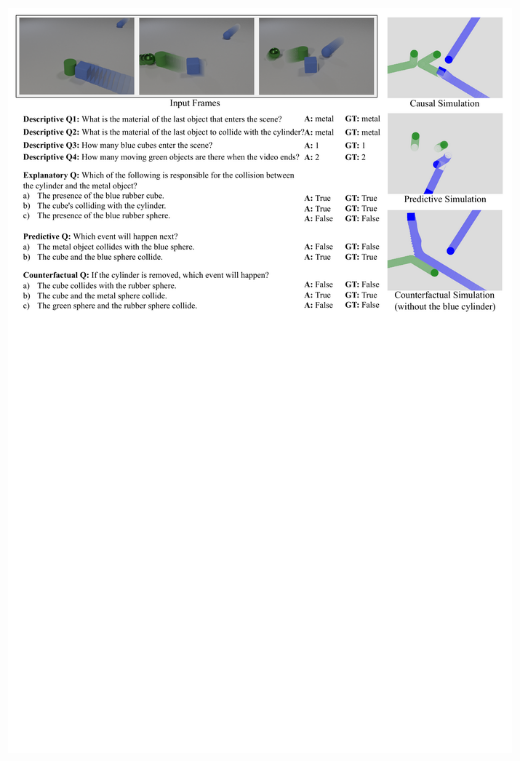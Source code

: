 \documentclass[landscape,a0paper,fontscale=0.292]{baposter}
\begin{document}
\begin{poster}
{\begin{minipage}[t]{0.49\textwidth}
\begin{center}
            \includegraphics[width=\textwidth]{images/visualize_210.pdf}
        \end{center}
    \end{minipage}


}
\end{poster}
\end{document}

